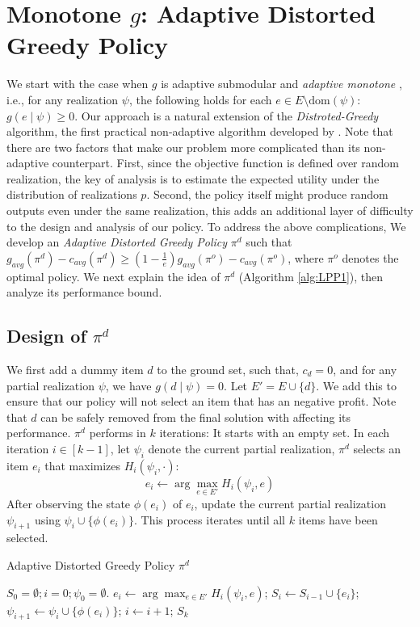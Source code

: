 \documentclass[twoside,leqno,twocolumn]{article}
\begin{document}
\section{Monotone $g$: Adaptive Distorted Greedy Policy}
We start with the case when $g$ is adaptive submodular and \emph{adaptive monotone} \cite{golovin2011adaptive}, i.e.,  for any realization $\psi$, the following holds for each $e\in E\setminus \mathrm{dom}(\psi)$: $g(e\mid \psi) \geq 0$.  Our approach is a natural extension of the \emph{Distroted-Greedy} algorithm, the first practical non-adaptive algorithm developed by \cite{harshaw2019submodular}. Note that there are two factors that make our problem more complicated than its non-adaptive counterpart. First, since the objective function is defined over random realization, the key of analysis is to estimate the expected utility under the distribution of realizations $p$. Second, the policy itself might produce random outputs even under the same realization, this adds an additional layer of difficulty to the design and analysis of our policy. To address the above complications, We develop an \emph{Adaptive Distorted Greedy Policy} $\pi^d$ such that $g_{avg}(\pi^d) - c_{avg}(\pi^d) \geq (1-\frac{1}{e})g_{avg}(\pi^o) - c_{avg}(\pi^o)$, where $\pi^o$ denotes the optimal policy. We next explain the idea of $\pi^d$ (Algorithm \ref{alg:LPP1}), then analyze its performance bound.

\subsection{Design of $\pi^d$} We first add a dummy item $d$ to the ground set, such that, $c_d=0$, and for any partial realization $\psi$, we have $g(d \mid \psi) =0$. Let $E'=E\cup \{d\}$. We add this to ensure that our policy will not select an item that has an negative profit. Note that $d$ can be safely removed from the final solution with affecting its performance. $\pi^{d}$  performs in $k$ iterations: It starts with an empty set. In each iteration $i\in [k-1]$, let $\psi_i$ denote the current partial realization, $\pi^{d}$ selects an item $e_i$ that maximizes $H_i(\psi_i, \cdot)$:
       \[e_i\leftarrow \arg\max_{e \in E'}H_i(\psi_i, e)\]
After observing the state $\phi(e_i)$ of $e_i$, update  the current partial realization $\psi_{i+1}$ using  $\psi_{i}\cup\{\phi(e_i)\}$.  This process iterates until all  $k$ items have been selected.


\begin{algorithm}[hptb]
\caption{Adaptive Distorted Greedy Policy $\pi^d$}
\label{alg:LPP1}
\begin{algorithmic}[1]
\STATE $S_0=\emptyset; i=0; \psi_0=\emptyset$.
\STATE $e_i\leftarrow \arg\max_{e \in E'}H_i(\psi_i, e)$;
\STATE $S_i\leftarrow S_{i-1}\cup \{e_i\}$;
\STATE $\psi_{i+1}\leftarrow \psi_{i}\cup\{\phi(e_i)\}$;  $i\leftarrow i+1$;
\ENDWHILE
\RETURN $S_k$
\end{algorithmic}
\end{algorithm}
\end{document}
